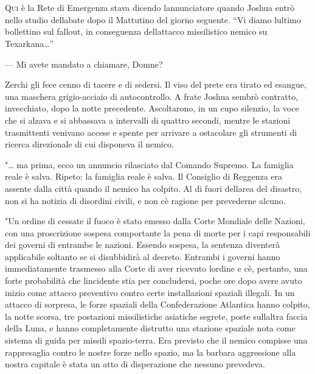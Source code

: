 	\chapter{\phantom{text}}

\lettrine{Q}{ui} è la Rete di Emergenza stava dicendo
l\textquotesingle annunciatore quando Joshua entrò nello studio
dell\textquotesingle abate dopo il Mattutino del giorno seguente. ``Vi
diamo l\textquotesingle ultimo bollettino sul fallout, in conseguenza
dell\textquotesingle attacco missilistico nemico su Texarkana\ldots''

--- Mi avete mandato a chiamare, Domne?

Zerchi gli fece cenno di tacere e di sedersi. Il viso del prete era
tirato ed esangue, una maschera grigio-acciaio di autocontrollo. A frate
Joshua sembrò contratto, invecchiato, dopo la notte precedente.
Ascoltarono, in un cupo silenzio, la voce che si alzava e si abbassava a
intervalli di quattro secondi, mentre le stazioni trasmittenti venivano
accese e spente per arrivare a ostacolare gli strumenti di ricerca
direzionale di cui disponeva il nemico.

"\ldots{} ma prima, ecco un annuncio rilasciato dal Comando Supremo. La
famiglia reale è salva. Ripeto: la famiglia reale è salva. Il Consiglio
di Reggenza era assente dalla città quando il nemico ha colpito. Al di
fuori dell\textquotesingle area del disastro, non si ha notizia di
disordini civili, e non c\textquotesingle è ragione per prevederne
alcuno.

"Un ordine di cessate il fuoco è stato emesso dalla Corte Mondiale delle
Nazioni, con una proscrizione sospesa comportante la pena di morte per i
capi responsabili dei governi di entrambe le nazioni. Essendo sospesa,
la sentenza diventerà applicabile soltanto se si disubbidirà al decreto.
Entrambi i governi hanno immediatamente trasmesso alla Corte di aver
ricevuto l\textquotesingle ordine e c\textquotesingle è, pertanto, una
forte probabilità che l\textquotesingle incidente stia per concludersi,
poche ore dopo avere avuto inizio come attacco preventivo contro certe
installazioni spaziali illegali. In un attacco di sorpresa, le forze
spaziali della Confederazione Atlantica hanno colpito, la notte scorsa,
tre postazioni missilistiche asiatiche segrete, poste
sull\textquotesingle altra faccia della Luna, e hanno completamente
distrutto una stazione spaziale nota come sistema di guida per missili
spazio-terra. Era previsto che il nemico compisse una rappresaglia
contro le nostre forze nello spazio, ma la barbara aggressione alla
nostra capitale è stata un atto di disperazione che nessuno prevedeva.

